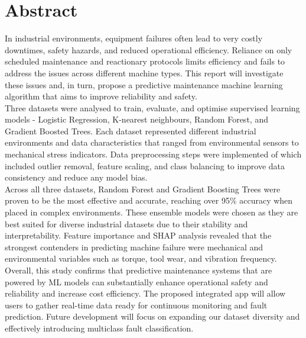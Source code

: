 \documentclass[11pt]{article}
\begin{document}
    \pagebreak
    

\section*{Abstract}

In industrial environments, equipment failures often lead to very costly downtimes, safety hazards, and reduced operational efficiency. Reliance on only scheduled maintenance and reactionary protocols limits efficiency and fails to address the issues across different machine types. This report will investigate these issues and, in turn, propose a predictive maintenance machine learning algorithm that aims to improve reliability and safety.\\

Three datasets were analysed to train, evaluate, and optimise supervised learning models - Logistic Regression, K-nearest neighbours, Random Forest, and Gradient Boosted Trees. Each dataset represented different industrial environments and data characteristics that ranged from environmental sensors to mechanical stress indicators. Data preprocessing steps were implemented of which included outlier removal, feature scaling, and class balancing to improve data consistency and reduce any model bias.\\

Across all three datasets, Random Forest and Gradient Boosting Trees were proven to be the most effective and accurate, reaching over 95\% accuracy when placed in complex environments. These ensemble models were chosen as they are best suited for diverse industrial datasets due to their stability and interpretability. Feature importance and SHAP analysis revealed that the strongest contenders in predicting machine failure were mechanical and environmental variables such as torque, tool wear, and vibration frequency. \\

Overall, this study confirms that predictive maintenance systems that are powered by ML models can substantially enhance operational safety and reliability and increase cost efficiency. The proposed integrated app will allow users to gather real-time data ready for continuous monitoring and fault prediction. Future development will focus on expanding our dataset diversity and effectively introducing multiclass fault classification. 




\newpage
\tableofcontents
\newpage
\end{document}
